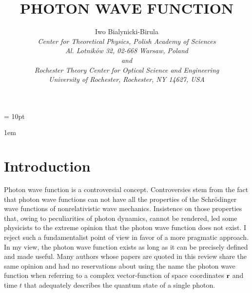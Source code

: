 \documentclass{article}
\begin{document}
\def\nocite#1{\@bsphack
  \if@filesw\immediate\write\@auxout{\string\citation{#1}}\fi
  \@esphack}


\def\@cite#1#2{{#1\if@tempswa , #2\fi}}
\def\@biblabel#1{[#1]}

\def\@listI{\leftmargin\leftmargini \parsep 0\p@ plus1\p@ minus\p@
\topsep 0\p@ plus3\p@ minus\p@
\itemsep 0\p@ plus1\p@ minus\p@}



  \ps@headings

\textheight=39.25pc \textwidth=27pc \headsep 12pt \topskip = 10pt \footskip 12pt \marginparwidth 48pt

\parindent1em

\title{PHOTON WAVE FUNCTION}

\author{Iwo Bialynicki-Birula\\
{\em Center for Theoretical Physics, Polish Academy of Sciences\\ Al.
Lotnik\'ow 32, 02-668 Warsaw, Poland\\and\\
Rochester Theory Center for Optical Science and Engineering\\
University of Rochester, Rochester, NY 14627, USA }}
\maketitle

\tableofcontents
\section{Introduction}

Photon wave function is a controversial concept. Controversies stem from the
fact that photon wave functions can not have all the properties of the
Schr\"odinger wave functions of nonrelativistic wave mechanics. Insistence
on those properties that, owing to peculiarities of photon dynamics, cannot
be rendered, led some physicists to the extreme opinion that the photon wave
function does not exist. I reject such a fundamentalist point of view in
favor of a more pragmatic approach. In my view, the photon wave function
exists as long as it can be precisely defined and made useful. Many authors
whose papers are quoted in this review share the same opinion and had no
reservations about using the name the photon wave function when referring to
a complex vector-function of space coordinates ${\bf r}$ and time $t$ that
adequately describes the quantum state of a single photon.
\end{document}
